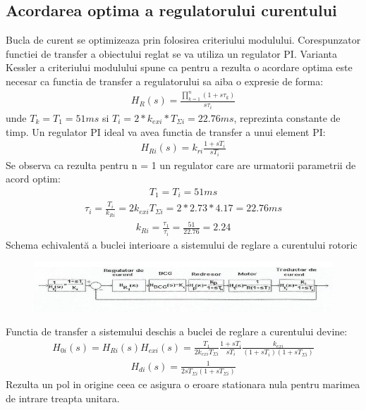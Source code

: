 \documentclass[11pt]{article}
\begin{document}
\subsection{Acordarea optima a regulatorului curentului}
Bucla de curent se optimizeaza prin folosirea criteriului modulului. Corespunzator functiei de transfer a obiectului reglat se va utiliza un regulator PI. Varianta Kessler a criteriului modulului spune ca pentru a rezulta o acordare optima este necesar ca functia de transfer a regulatorului sa aiba o expresie de forma:
\begin{align*}
H_R(s)=\frac{\prod_{k=1}^{n}(1+s\tau_k)}{s\tau_i}
\end{align*}
unde $T_k=T_1=51ms$ si $T_i=2\ast k_{exi}\ast T_{\Sigma i}=22.76ms$, reprezinta constante de timp.
Un regulator PI ideal va avea functia de transfer a unui element PI:
\begin{align*}
H_{Ri}(s)=k_{ri}\frac{1+sT_i}{sT_i}
\end{align*}
Se observa ca rezulta pentru n = 1 un regulator care are urmatorii parametrii de acord optim:
\begin{align*}
T_1=T_i=51ms
\end{align*}
\begin{align*}
\tau_i=\frac{T_i}{k_{Ri}}=2k_{exi}T_{\Sigma i}=2\ast 2.73 \ast 4.17=22.76 ms
\end{align*}
\begin{align*}
k_{Ri}=\frac{\tau_1}{\tau_i}=\frac{51}{22.76}=2.24
\end{align*}
Schema echivalentă a buclei interioare a sistemului de reglare a curentului rotoric
\begin{figure}[H]
	\centering
	\includegraphics[width=.9\linewidth]{fig15.png}
	\label{fig:test2}
\end{figure}
Functia de transfer a sistemului deschis a buclei de reglare a curentului devine:
\begin{align*}
H_{0i}(s)=H_{Ri}(s)H_{exi}(s)=\frac{T_1}{2k_{exi}T_{\Sigma i}}\frac{1+sT_i}{sT_i}\frac{k_{exi}}{(1+sT_i)(1+sT_{\Sigma i})}
\end{align*}
\begin{align*}
H_{di}(s)=\frac{1}{2sT_{\Sigma i}(1+sT_{\Sigma i})}
\end{align*}
Rezulta un pol in origine ceea ce asigura o eroare stationara nula pentru marimea de intrare treapta unitara.
\end{document}
